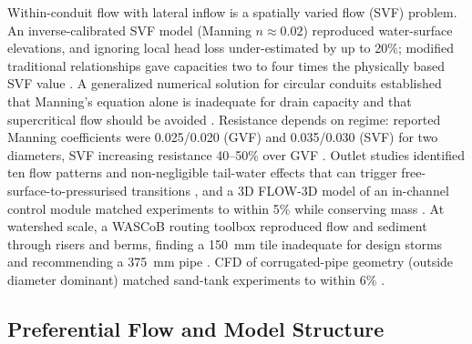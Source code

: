\documentclass[11pt]{article}
\begin{document}
Within-conduit flow with lateral inflow is a spatially varied flow (SVF) problem. An inverse-calibrated SVF model (Manning $n\approx0.02$) reproduced water-surface elevations, and ignoring local head loss under-estimated by up to 20\%; modified traditional relationships gave capacities two to four times the physically based SVF value \parencite{Bayat2011}. A generalized numerical solution for circular conduits established that Manning's equation alone is inadequate for drain capacity and that supercritical flow should be avoided \parencite{Graber2004}. Resistance depends on regime: reported Manning coefficients were 0.025/0.020 (GVF) and 0.035/0.030 (SVF) for two diameters, SVF increasing resistance 40--50\% over GVF \parencite{Kouchakzadeh2011}. Outlet studies identified ten flow patterns and non-negligible tail-water effects that can trigger free-surface-to-pressurised transitions \parencite{Nédélec2008}, and a 3D FLOW-3D model of an in-channel control module matched experiments to within 5\% while conserving mass \parencite{Abdurrasheed2019}. At watershed scale, a WASCoB routing toolbox reproduced flow and sediment through risers and berms, finding a 150~mm tile inadequate for design storms and recommending a 375~mm pipe \parencite{Gupta2019}. CFD of corrugated-pipe geometry (outside diameter dominant) matched sand-tank experiments to within 6\% \parencite{Wu2022}.

\subsection{Preferential Flow and Model Structure}
\end{document}
